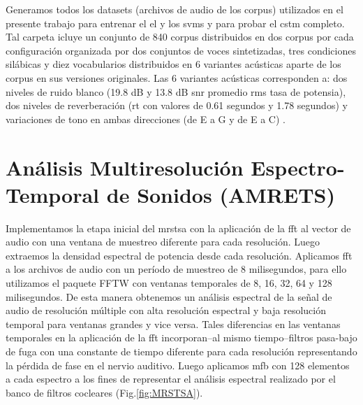 Generamos todos los datasets (archivos de audio de los corpus) utilizados en el presente trabajo para entrenar el \gls{el} y los \glspl{svm} y para probar el \gls{cstm} completo. Tal carpeta icluye un conjunto de 840 corpus distribuidos en dos corpus por cada configuración organizada por dos conjuntos de voces sintetizadas, tres condiciones silábicas y diez vocabularios distribuidos en 6 variantes acústicas aparte de los corpus en sus versiones originales. Las 6 variantes acústicas corresponden a: dos niveles de ruido blanco (19.8 dB y 13.8 dB \gls{snr} promedio \gls{rms} tasa de potensia), dos niveles de reverberación (\gls{rt} con valores de 0.61 segundos y 1.78 segundos) y variaciones de tono en ambas direcciones (de E a G y de E a C) \cite{dematties_dario_2019_2576130}.




\section{Análisis Multiresolución Espectro-Temporal de Sonidos (AMRETS)}
\label{mrstsa}

Implementamos la etapa inicial del \gls{mrstsa} con la aplicación de la \gls{fft} al vector de audio con una ventana de muestreo diferente para cada resolución. Luego extraemos la densidad espectral de potencia desde cada resolución. Aplicamos \gls{fft} a los archivos de audio con un período de muestreo de 8 milisegundos, para ello utilizamos el paquete FFTW \cite{FFTW05, fftw} con ventanas temporales de 8, 16, 32, 64 y 128 milisegundos. De esta manera obtenemos un análisis espectral de la señal de audio de resolución múltiple con alta resolución espectral y baja resolución temporal para ventanas grandes y vice versa. Tales diferencias en las ventanas temporales en la aplicación de la \gls{fft} incorporan--al mismo tiempo--filtros pasa-bajo de fuga con una constante de tiempo diferente para cada resolución representando la pérdida de fase en el nervio auditivo. Luego aplicamos \gls{mfb} con 128 elementos a cada espectro a los fines de representar el análisis espectral realizado por el banco de filtros cocleares (Fig.\ref{fig:MRSTSA}).


